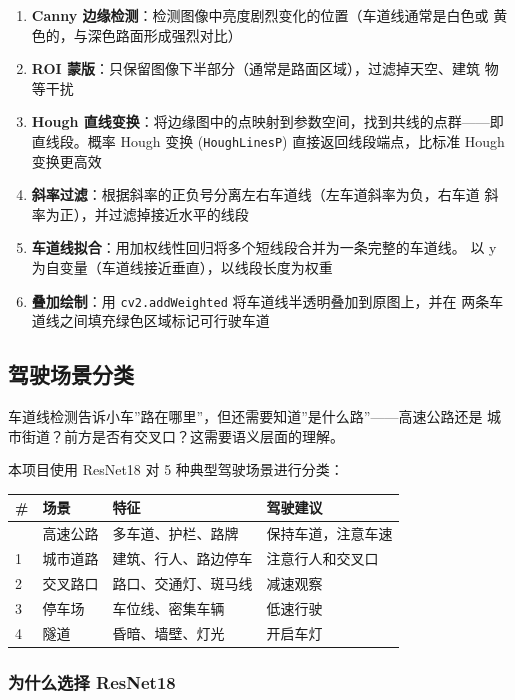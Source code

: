 \begin{enumerate}
\def\labelenumi{\arabic{enumi}.}
\item
  \textbf{Canny
  边缘检测}：检测图像中亮度剧烈变化的位置（车道线通常是白色或
  黄色的，与深色路面形成强烈对比）
\item
  \textbf{ROI
  蒙版}：只保留图像下半部分（通常是路面区域），过滤掉天空、建筑 物等干扰
\item
  \textbf{Hough
  直线变换}：将边缘图中的点映射到参数空间，找到共线的点群------即
  直线段。概率 Hough 变换 (\passthrough{\lstinline!HoughLinesP!})
  直接返回线段端点，比标准 Hough 变换更高效
\item
  \textbf{斜率过滤}：根据斜率的正负号分离左右车道线（左车道斜率为负，右车道
  斜率为正），并过滤掉接近水平的线段
\item
  \textbf{车道线拟合}：用加权线性回归将多个短线段合并为一条完整的车道线。
  以 y 为自变量（车道线接近垂直），以线段长度为权重
\item
  \textbf{叠加绘制}：用 \passthrough{\lstinline!cv2.addWeighted!}
  将车道线半透明叠加到原图上，并在
  两条车道线之间填充绿色区域标记可行驶车道
\end{enumerate}

\subsection{驾驶场景分类}\label{src-experiment-case6-h12}

车道线检测告诉小车''路在哪里''，但还需要知道''是什么路''------高速公路还是
城市街道？前方是否有交叉口？这需要语义层面的理解。

本项目使用 ResNet18 对 5 种典型驾驶场景进行分类：

\begin{longtable}[]{@{}llll@{}}
\toprule\noalign{}
\# & 场景 & 特征 & 驾驶建议 \\
\midrule\noalign{}
\endhead
\bottomrule\noalign{}
\endlastfoot
0 & 高速公路 & 多车道、护栏、路牌 & 保持车道，注意车速 \\
1 & 城市道路 & 建筑、行人、路边停车 & 注意行人和交叉口 \\
2 & 交叉路口 & 路口、交通灯、斑马线 & 减速观察 \\
3 & 停车场 & 车位线、密集车辆 & 低速行驶 \\
4 & 隧道 & 昏暗、墙壁、灯光 & 开启车灯 \\
\end{longtable}

\subsubsection{为什么选择 ResNet18}\label{src-experiment-case6-h13}

